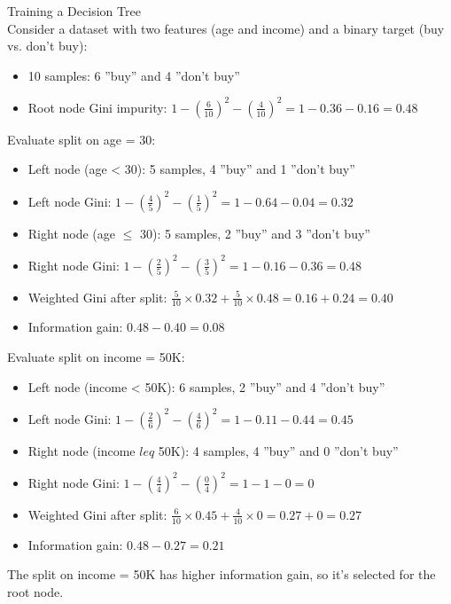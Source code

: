 \begin{example2}{Training a Decision Tree}\\
Consider a dataset with two features (age and income) and a binary target (buy vs. don't buy):
\begin{itemize}
    \item 10 samples: 6 ''buy'' and 4 ''don't buy''
    \item Root node Gini impurity: $1 - (\frac{6}{10})^2 - (\frac{4}{10})^2 = 1 - 0.36 - 0.16 = 0.48$
\end{itemize}
\tcblower
Evaluate split on age = 30:
\begin{itemize}
    \item Left node (age < 30): 5 samples, 4 ''buy'' and 1 ''don't buy''
    \item Left node Gini: $1 - (\frac{4}{5})^2 - (\frac{1}{5})^2 = 1 - 0.64 - 0.04 = 0.32$
    \item Right node (age $\leq$ 30): 5 samples, 2 ''buy'' and 3 ''don't buy''
    \item Right node Gini: $1 - (\frac{2}{5})^2 - (\frac{3}{5})^2 = 1 - 0.16 - 0.36 = 0.48$
    \item Weighted Gini after split: $\frac{5}{10} \times 0.32 + \frac{5}{10} \times 0.48 = 0.16 + 0.24 = 0.40$
    \item Information gain: $0.48 - 0.40 = 0.08$
\end{itemize}

Evaluate split on income = 50K:
\begin{itemize}
    \item Left node (income < 50K): 6 samples, 2 ''buy'' and 4 ''don't buy''
    \item Left node Gini: $1 - (\frac{2}{6})^2 - (\frac{4}{6})^2 = 1 - 0.11 - 0.44 = 0.45$
    \item Right node (income $leq$ 50K): 4 samples, 4 ''buy'' and 0 ''don't buy''
    \item Right node Gini: $1 - (\frac{4}{4})^2 - (\frac{0}{4})^2 = 1 - 1 - 0 = 0$
    \item Weighted Gini after split: $\frac{6}{10} \times 0.45 + \frac{4}{10} \times 0 = 0.27 + 0 = 0.27$
    \item Information gain: $0.48 - 0.27 = 0.21$
\end{itemize}

The split on income = 50K has higher information gain, so it's selected for the root node.
\end{example2}

\raggedcolumns
\columnbreak


